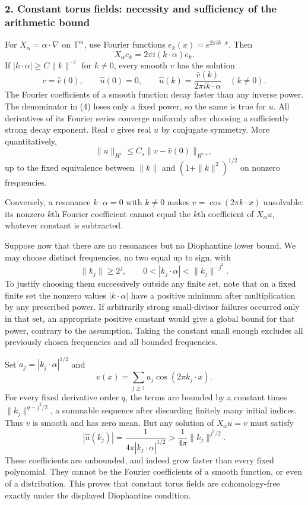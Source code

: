 \documentclass[11pt]{article}
\begin{document}
\subsubsection{2. Constant torus fields: necessity and sufficiency of the arithmetic bound}
For $X_\alpha=\alpha\cdot\nabla$ on $\mathbb T^m$, use Fourier functions $e_k(x)=e^{2\pi i k\cdot x}$. Then
\[
 X_\alpha e_k=2\pi i(k\cdot\alpha)e_k.                   \tag{3}
\]
If $|k\cdot\alpha|\geq C\|k\|^{-\tau}$ for $k\ne0$, every smooth $v$ has the solution
\[
 c=\widehat v(0),\qquad \widehat u(0)=0,\qquad
 \widehat u(k)=\frac{\widehat v(k)}{2\pi i k\cdot\alpha}
 \quad(k\ne0).                                          \tag{4}
\]
The Fourier coefficients of a smooth function decay faster than any inverse power. The denominator in (4) loses only a fixed power, so the same is true for $u$. All derivatives of its Fourier series converge uniformly after choosing a sufficiently strong decay exponent. Real $v$ gives real $u$ by conjugate symmetry. More quantitatively,
\[
 \|u\|_{H^s}\leq C_s\|v-\widehat v(0)\|_{H^{s+\tau}}
                                                               \tag{5}
\]
up to the fixed equivalence between $\|k\|$ and $(1+\|k\|^2)^{1/2}$ on nonzero frequencies.

Conversely, a resonance $k\cdot\alpha=0$ with $k\ne0$ makes $v=\cos(2\pi k\cdot x)$ unsolvable: its nonzero $k$th Fourier coefficient cannot equal the $k$th coefficient of $X_\alpha u$, whatever constant is subtracted.

Suppose now that there are no resonances but no Diophantine lower bound. We may choose distinct frequencies, no two equal up to sign, with
\[
 \|k_j\|\geq2^j,\qquad
 0<|k_j\cdot\alpha|<\|k_j\|^{-j^2}.                     \tag{6}
\]
To justify choosing them successively outside any finite set, note that on a fixed finite set the nonzero values $|k\cdot\alpha|$ have a positive minimum after multiplication by any prescribed power. If arbitrarily strong small-divisor failures occurred only in that set, an appropriate positive constant would give a global bound for that power, contrary to the assumption. Taking the constant small enough excludes all previously chosen frequencies and all bounded frequencies.

Set $a_j=|k_j\cdot\alpha|^{1/2}$ and
\[
 v(x)=\sum_{j\geq1} a_j\cos(2\pi k_j\cdot x).
\]
For every fixed derivative order $q$, the terms are bounded by a constant times $\|k_j\|^{q-j^2/2}$, a summable sequence after discarding finitely many initial indices. Thus $v$ is smooth and has zero mean. But any solution of $X_\alpha u=v$ must satisfy
\[
 |\widehat u(k_j)|=\frac1{4\pi|k_j\cdot\alpha|^{1/2}}
 >\frac1{4\pi}\|k_j\|^{j^2/2}.                           \tag{7}
\]
These coefficients are unbounded, and indeed grow faster than every fixed polynomial. They cannot be the Fourier coefficients of a smooth function, or even of a distribution. This proves that constant torus fields are cohomology-free exactly under the displayed Diophantine condition.
\end{document}
